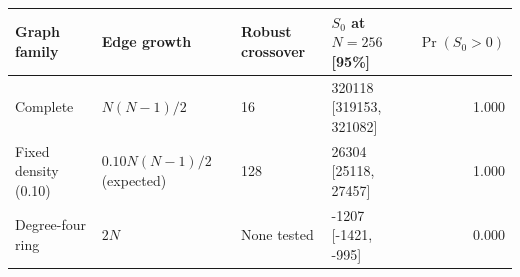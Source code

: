 \begin{tabular}{@{}llllr@{}}
\toprule
Graph family & Edge growth & Robust crossover & $S_0$ at $N=256$ [95\%] & $\Pr(S_0>0)$ \\
\midrule
Complete & $N(N-1)/2$ & 16 & 320118 [319153, 321082] & 1.000 \\
Fixed density (0.10) & $0.10N(N-1)/2$ (expected) & 128 & 26304 [25118, 27457] & 1.000 \\
Degree-four ring & $2N$ & None tested & -1207 [-1421, -995] & 0.000 \\
\bottomrule
\end{tabular}
